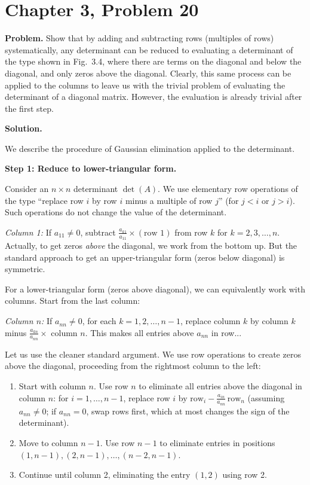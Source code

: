 \documentclass[12pt]{article}
\begin{document}
\section*{Chapter 3, Problem 20}

\textbf{Problem.} Show that by adding and subtracting rows (multiples of rows) systematically, any determinant can be reduced to evaluating a determinant of the type shown in Fig.\ 3.4, where there are terms on the diagonal and below the diagonal, and only zeros above the diagonal. Clearly, this same process can be applied to the columns to leave us with the trivial problem of evaluating the determinant of a diagonal matrix. However, the evaluation is already trivial after the first step.

\bigskip
\textbf{Solution.}

We describe the procedure of Gaussian elimination applied to the determinant.

\textbf{Step 1: Reduce to lower-triangular form.}

Consider an $n \times n$ determinant $\det(A)$. We use elementary row operations of the type ``replace row $i$ by row $i$ minus a multiple of row $j$'' (for $j < i$ or $j > i$). Such operations do not change the value of the determinant.

\medskip
\textit{Column 1:} If $a_{11} \neq 0$, subtract $\frac{a_{k1}}{a_{11}} \times (\text{row }1)$ from row $k$ for $k = 2, 3, \ldots, n$. Actually, to get zeros \emph{above} the diagonal, we work from the bottom up. But the standard approach to get an upper-triangular form (zeros below diagonal) is symmetric.

For a lower-triangular form (zeros above diagonal), we can equivalently work with columns. Start from the last column:

\textit{Column $n$:} If $a_{nn} \neq 0$, for each $k = 1, 2, \ldots, n-1$, replace column $k$ by column $k$ minus $\frac{a_{kn}}{a_{nn}} \times$ column $n$. This makes all entries above $a_{nn}$ in row...

Let us use the cleaner standard argument. We use row operations to create zeros above the diagonal, proceeding from the rightmost column to the left:

\begin{enumerate}
\item Start with column $n$. Use row $n$ to eliminate all entries above the diagonal in column $n$: for $i = 1, \ldots, n-1$, replace row $i$ by $\text{row}_i - \frac{a_{in}}{a_{nn}}\,\text{row}_n$ (assuming $a_{nn}\neq 0$; if $a_{nn}=0$, swap rows first, which at most changes the sign of the determinant).

\item Move to column $n-1$. Use row $n-1$ to eliminate entries in positions $(1, n-1), (2, n-1), \ldots, (n-2, n-1)$.

\item Continue until column 2, eliminating the entry $(1,2)$ using row 2.
\end{enumerate}
\end{document}
